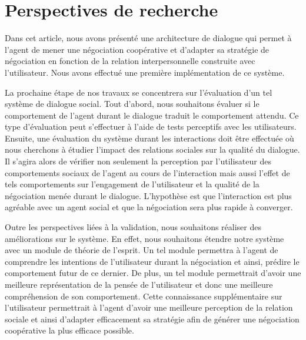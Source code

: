 \documentclass [french]{sig-alternate-05-2015}
\begin{document}
\section{Perspectives de recherche}
\label{conc}
Dans cet article, nous avons présenté une architecture de dialogue qui permet à l'agent de mener une négociation coopérative et d'adapter sa stratégie de négociation en fonction de la relation interpersonnelle construite avec l'utilisateur. Nous avons effectué une première implémentation de ce système. 

\par La prochaine étape de nos travaux se concentrera sur l’évaluation d’un tel système de dialogue social. Tout d'abord, nous souhaitons évaluer si le comportement de l'agent durant le dialogue traduit le comportement attendu. Ce type d'évaluation peut s'effectuer à l'aide de tests perceptifs avec les utilisateurs. 
Ensuite, une évaluation du système durant les interactions doit être effectuée où nous cherchons à étudier l'impact des relations sociales sur la qualité du dialogue. Il s’agira alors de vérifier non seulement la perception par l’utilisateur des comportements sociaux de l’agent au cours de l'interaction mais aussi l’effet de tels comportements sur l’engagement de l’utilisateur et la qualité de la négociation menée durant le dialogue. L'hypothèse est que l'interaction est plus agréable avec un agent social et que la négociation sera plus rapide à converger.

\par Outre les perspectives liées à la validation, nous souhaitons réaliser des améliorations sur le système. En effet, nous souhaitons étendre notre système avec un module de théorie de l'esprit. Un tel module permettra à l'agent de comprendre les intentions de l'utilisateur durant la négociation et ainsi, prédire le comportement futur de ce dernier.  De plus, un tel module permettrait d'avoir une meilleure  représentation de la pensée de l'utilisateur et donc une meilleure compréhension de son comportement. Cette connaissance supplémentaire sur l'utilisateur permettrait à l'agent d'avoir une meilleure perception de la relation sociale et ainsi d'adapter efficacement sa stratégie afin de générer une négociation coopérative la plus efficace possible.
\vskip 4pt


\end{document}
